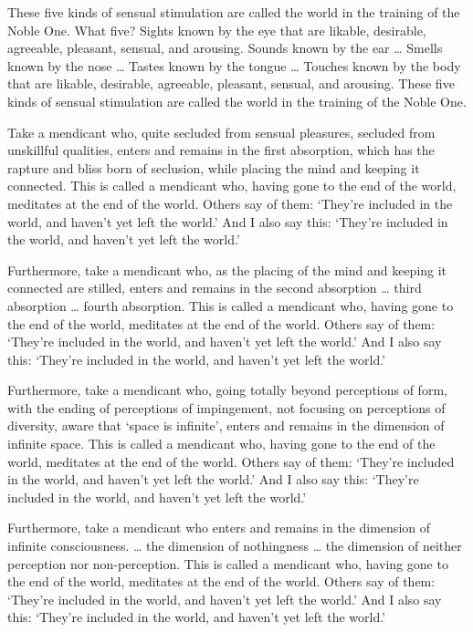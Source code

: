\documentclass[12pt,openany]{book}%
\begin{document}
These five kinds of sensual stimulation are called the world in the training of the Noble One. What five? Sights known by the eye that are likable, desirable, agreeable, pleasant, sensual, and arousing. Sounds known by the ear … Smells known by the nose … Tastes known by the tongue … Touches known by the body that are likable, desirable, agreeable, pleasant, sensual, and arousing. These five kinds of sensual stimulation are called the world in the training of the Noble One. 

Take a mendicant who, quite secluded from sensual pleasures, secluded from unskillful qualities, enters and remains in the first absorption, which has the rapture and bliss born of seclusion, while placing the mind and keeping it connected. This is called a mendicant who, having gone to the end of the world, meditates at the end of the world. Others say of them: ‘They’re included in the world, and haven’t yet left the world.’ And I also say this: ‘They’re included in the world, and haven’t yet left the world.’ 

Furthermore, take a mendicant who, as the placing of the mind and keeping it connected are stilled, enters and remains in the second absorption … third absorption … fourth absorption. This is called a mendicant who, having gone to the end of the world, meditates at the end of the world. Others say of them: ‘They’re included in the world, and haven’t yet left the world.’ And I also say this: ‘They’re included in the world, and haven’t yet left the world.’ 

Furthermore, take a mendicant who, going totally beyond perceptions of form, with the ending of perceptions of impingement, not focusing on perceptions of diversity, aware that ‘space is infinite’, enters and remains in the dimension of infinite space. This is called a mendicant who, having gone to the end of the world, meditates at the end of the world. Others say of them: ‘They’re included in the world, and haven’t yet left the world.’ And I also say this: ‘They’re included in the world, and haven’t yet left the world.’ 

Furthermore, take a mendicant who enters and remains in the dimension of infinite consciousness. … the dimension of nothingness … the dimension of neither perception nor non-perception. This is called a mendicant who, having gone to the end of the world, meditates at the end of the world. Others say of them: ‘They’re included in the world, and haven’t yet left the world.’ And I also say this: ‘They’re included in the world, and haven’t yet left the world.’ 
\end{document}
